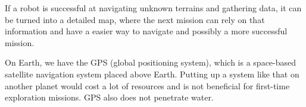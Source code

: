 If a robot is successful at navigating unknown terrains and gathering data, it can be turned into a detailed map, where the next mission can rely on that information and have a easier way to navigate and possibly a more successful mission. 

On Earth, we have the GPS (global positioning system), which is a space-based satellite navigation system placed above Earth\cite{gpsgeneral}. Putting up a system like that on another planet would cost a lot of resources and is not beneficial for first-time exploration missions. GPS also does not penetrate water\cite{underwatergps}.
